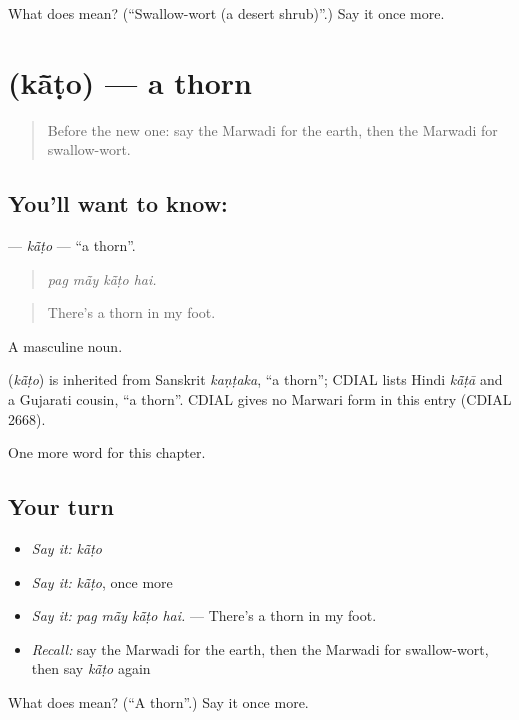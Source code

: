 \begin{tcolorbox}[breakable,colback=teal!4,colframe=teal!35!black,title={Before you move on}]
What does  mean? (\textquotedblleft{}Swallow-wort (a desert shrub)\textquotedblright{}.) Say it once more.
\end{tcolorbox}
\section[\texorpdfstring{\mw{कांटो} (kā̃ṭo)}{कांटो (kā̃ṭo)}]{ (kā̃ṭo) — a thorn}

\label{lesson:MW-C230-kato}



\begin{quote}
Before the new one: say the Marwadi for the earth, then the Marwadi for swallow-wort.
\end{quote}

\subsection*{You'll want to know: }
\textbf{} — \emph{kā̃ṭo} — \textquotedblleft{}a thorn\textquotedblright{}.

\begin{quote}
   
\end{quote}

\begin{quote}
\emph{pag mā̃y kā̃ṭo hai.}
\end{quote}

\begin{quote}
There's a thorn in my foot.
\end{quote}

A masculine noun.

\begin{cousinweb}
\textbf{} (\emph{kā̃ṭo}) is inherited from Sanskrit \emph{kaṇṭaka}, \textquotedblleft{}a thorn\textquotedblright{}; CDIAL lists Hindi \emph{kā̃ṭā} and a Gujarati cousin, \textquotedblleft{}a thorn\textquotedblright{}. CDIAL gives no Marwari form in this entry (CDIAL 2668).
\end{cousinweb}

\begin{grammarlens}[title={What you've built}]
One more word for this chapter.
\end{grammarlens}

\subsection*{Your turn}
\begin{itemize}
\raggedright
  \item \emph{Say it:} \emph{kā̃ṭo}
  \item \emph{Say it:} \emph{kā̃ṭo}, once more
  \item \emph{Say it:} \emph{pag mā̃y kā̃ṭo hai.} — There's a thorn in my foot.
  \item \emph{Recall:} say the Marwadi for the earth, then the Marwadi for swallow-wort, then say \emph{kā̃ṭo} again
\end{itemize}

\begin{tcolorbox}[breakable,colback=teal!4,colframe=teal!35!black,title={Before you move on}]
What does  mean? (\textquotedblleft{}A thorn\textquotedblright{}.) Say it once more.
\end{tcolorbox}

